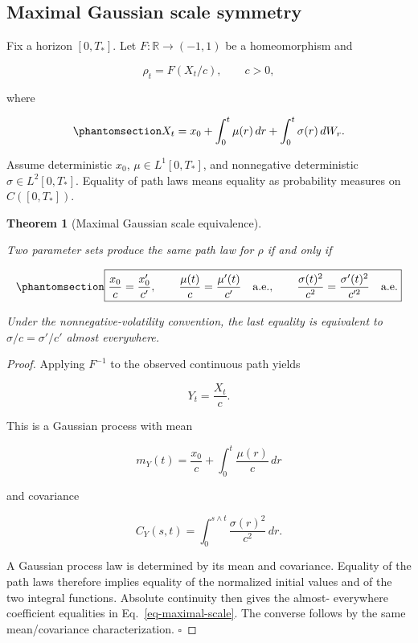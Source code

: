 \documentclass[
  english,
  11pt,
  letterpaper,
  DIV=11,
  numbers=noendperiod]{scrartcl}
\theoremstyle{plain}
\newtheorem{theorem}{Theorem}[section]
\theoremstyle{plain}
\theoremstyle{plain}
\theoremstyle{plain}
\theoremstyle{remark}
\begin{document}
\subsection{Maximal Gaussian scale symmetry}\label{sec-scale-symmetry}

Fix a horizon \([0,T_*]\). Let \(F:\mathbb R\to(-1,1)\) be a
homeomorphism and

\[
\rho_t=F(X_t/c),\qquad c>0,
\]

where

\begin{equation}\protect\phantomsection\label{eq-time-dependent-factor}{
X_t
=x_0+\int_0^t\mu(r)\,dr+\int_0^t\sigma(r)\,dW_r.
}\end{equation}

Assume deterministic \(x_0\), \(\mu\in L^1[0,T_*]\), and nonnegative
deterministic \(\sigma\in L^2[0,T_*]\). Equality of path laws means
equality as probability measures on \(C([0,T_*])\).

\begin{theorem}[Maximal Gaussian scale
equivalence]\protect\hypertarget{thm-scale-symmetry}{}\label{thm-scale-symmetry}

Two parameter sets produce the same path law for \(\rho\) if and only if

\begin{equation}\protect\phantomsection\label{eq-maximal-scale}{
\boxed{
\frac{x_0}{c}=\frac{x_0'}{c'},
\qquad
\frac{\mu(t)}{c}=\frac{\mu'(t)}{c'}
\quad\text{a.e.},
\qquad
\frac{\sigma(t)^2}{c^2}
=\frac{\sigma'(t)^2}{c'^2}
\quad\text{a.e.}
}
}\end{equation}

Under the nonnegative-volatility convention, the last equality is
equivalent to \(\sigma/c=\sigma'/c'\) almost everywhere.

\end{theorem}

\begin{proof}
Applying \(F^{-1}\) to the observed continuous path yields

\[
Y_t=\frac{X_t}{c}.
\]

This is a Gaussian process with mean

\[
m_Y(t)
=\frac{x_0}{c}
+\int_0^t\frac{\mu(r)}{c}\,dr
\]

and covariance

\[
C_Y(s,t)
=\int_0^{s\wedge t}
\frac{\sigma(r)^2}{c^2}\,dr.
\]

A Gaussian process law is determined by its mean and covariance.
Equality of the path laws therefore implies equality of the normalized
initial values and of the two integral functions. Absolute continuity
then gives the almost- everywhere coefficient equalities in
Eq.~\ref{eq-maximal-scale}. The converse follows by the same
mean/covariance characterization. \(\square\)
\end{proof}
\end{document}
